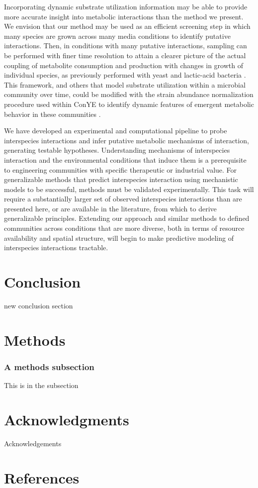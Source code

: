 \documentclass[11pt,twocolumn,notitlepage,openany,twoside]{book}
\begin{document}
\begin{refsection}
Incorporating dynamic substrate utilization information may be able to provide more accurate insight into metabolic interactions than the method we present. We envision that our method may be used as an efficient screening step in which many species are grown across many media conditions to identify putative interactions. Then, in conditions with many putative interactions, sampling can be performed with finer time resolution to attain a clearer picture of the actual coupling of metabolite consumption and production with changes in growth of individual species, as previously performed with yeast and lactic-acid bacteria \cite{Ponomarova2017-ob}. This framework, and others that model substrate utilization within a microbial community over time, could be modified with the strain abundance normalization procedure used within ConYE to identify dynamic features of emergent metabolic behavior in these communities \cite{Erbilgin2017-la}.

We have developed an experimental and computational pipeline to probe interspecies interactions and infer putative metabolic mechanisms of interaction, generating testable hypotheses.  Understanding mechanisms of interspecies interaction and the environmental conditions that induce them is a prerequisite to engineering communities with specific therapeutic or industrial value. For generalizable methods that predict interspecies interaction using mechanistic models to be successful, methods must be validated experimentally. This task will require a substantially larger set of observed interspecies interactions than are presented here, or are available in the literature, from which to derive generalizable principles. Extending our approach and similar methods to defined communities across conditions that are more diverse, both in terms of resource availability and spatial structure, will begin to make predictive modeling of interspecies interactions tractable.

\section{Conclusion}

new conclusion section

\section{Methods}
\subsubsection{A methods subsection}
This is in the subsection

\section{Acknowledgments}

Acknowledgements

\section{References}
\printbibliography[heading=none]

\end{refsection}
\end{document}
